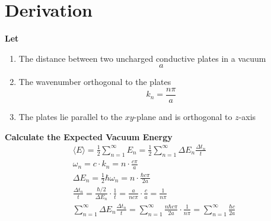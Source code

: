 \section{Derivation}
\noindent\textbf{Let}
\begin{enumerate}
    \item The distance between two uncharged conductive plates in a vacuum \[a\]
    \item The wavenumber orthogonal to the plates \[k_n = \frac{n\pi}{a}\]
    \item The plates lie parallel to the \(xy\)-plane and is orthogonal to \(z\)-axis
\end{enumerate}

\noindent\textbf{Calculate the Expected Vacuum Energy}
\begin{align*}
    &\langle E \rangle = \frac{1}{2}\sum_{n=1}^{\infty}E_n = \frac{1}{2}\sum_{n=1}^{\infty}\Delta E_n\frac{\Delta t_n}{t}& \\
    &\omega_n = c \cdot k_n = n \cdot \frac{c \pi}{a}&\\
    &\Delta E_n = \frac{1}{2} \hbar \omega_n = n \cdot \frac{ \hbar c \pi}{2a}& \\
    &\frac{\Delta t_n}{t} = \frac{\hbar/2}{\Delta E_n}\cdot\frac{1}{t} = \frac{a}{n c \pi}\cdot\frac{c}{a} = \frac{1}{n \pi}&\\
    &\sum_{n=1}^{\infty} \Delta E_n \frac{\Delta t_n}{t} = \sum_{n=1}^{\infty} \frac{n \hbar c \pi}{2 a} \cdot \frac{1}{n \pi} = \sum_{n=1}^{\infty} \frac{\hbar c }{2 a}&\\
\end{align*}
